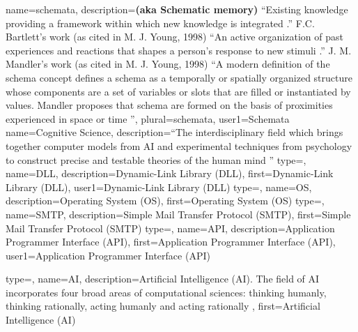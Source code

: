 {
  name=schemata,
  description={\textbf{(aka Schematic memory)} ``Existing knowledge providing a framework within which new knowledge is integrated \citep{YoungMichael1998}.'' F.C. Bartlett's work \citep{bartlett1932remembering} (as cited in M. J. Young, 1998) ``An active organization of past experiences and reactions that shapes a person's response to new stimuli \citep{YoungMichael1998}.'' J. M. Mandler's work (as cited in M. J. Young, 1998) ``A modern definition of the schema concept defines a schema as a temporally or spatially organized structure whose components are a set of variables or slots that are filled or instantiated by values.  Mandler proposes that schema are formed on the basis of proximities experienced in space or time \citep{YoungMichael1998}''},
  plural={schemata},
  user1={Schemata}
}
{
  name=Cognitive Science,
  description={``The interdisciplinary field which brings together computer models from \gls{AI} and experimental techniques from psychology to construct precise and testable theories of the human mind \citep{russell2009artificial}''}
}
{
  type=\acronymtype,
  name=DLL,
  description={Dynamic-Link Library (DLL)},
  first={Dynamic-Link Library (DLL)},
  user1={Dynamic-Link Library (DLL)}
}
{
  type=\acronymtype,
  name=OS,
  description={Operating System (OS)},
  first={Operating System (OS)}
}
{
  type=\acronymtype,
  name=SMTP,
  description={Simple Mail Transfer Protocol (SMTP)},
  first={Simple Mail Transfer Protocol (SMTP)}
}
{
  type=\acronymtype,
  name=API,
  description={Application Programmer Interface (API)},
  first={Application Programmer Interface (API)},
  user1={Application Programmer Interface (API)}
}

{
  type=\acronymtype,
  name=AI,
  description={Artificial Intelligence (AI). The field of AI incorporates four broad areas of computational sciences: thinking humanly, thinking rationally, acting humanly and acting rationally \citep{russell2009artificial}},
  first={Artificial Intelligence (AI)}
}

